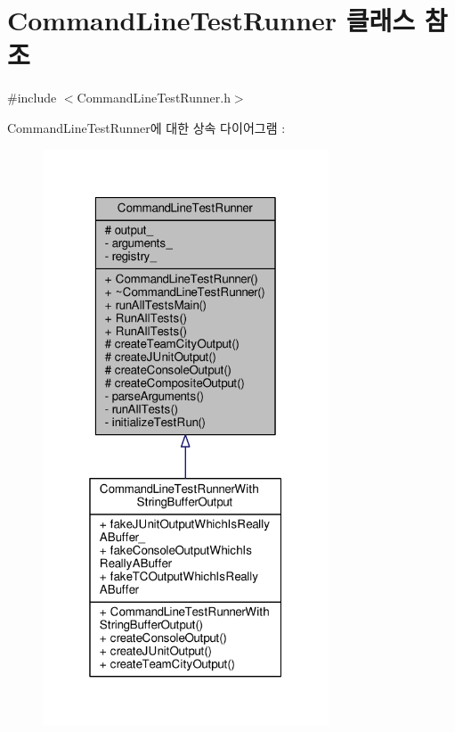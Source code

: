 \hypertarget{class_command_line_test_runner}{}\section{Command\+Line\+Test\+Runner 클래스 참조}
\label{class_command_line_test_runner}


{\ttfamily \#include $<$Command\+Line\+Test\+Runner.\+h$>$}



Command\+Line\+Test\+Runner에 대한 상속 다이어그램 \+: 
\nopagebreak
\begin{figure}[H]
\begin{center}
\leavevmode
\includegraphics[width=241pt]{class_command_line_test_runner__inherit__graph}
\end{center}
\end{figure}



